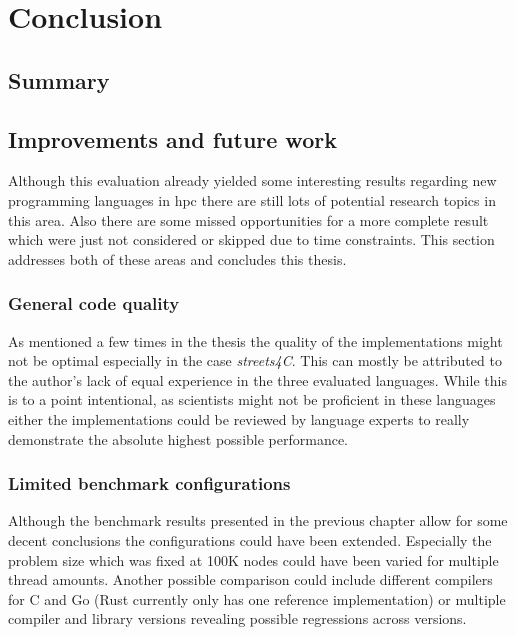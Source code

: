\chapter{Conclusion}
\label{ch:Conclusion}


\section{Summary}
\label{sec:Conclusion::Summary}

\section{Improvements and future work}
\label{sec:Conclusion::Improvements}

Although this evaluation already yielded some interesting results regarding new programming languages in \gls{hpc} there are still lots of potential research topics in this area. Also there are some missed opportunities for a more complete result which were just not considered or skipped due to time constraints. This section addresses both of these areas and concludes this thesis.

\subsection*{General code quality}
\label{subsec:Conclusion::Improvements::CodeQuality}

As mentioned a few times in the thesis the quality of the implementations might not be optimal especially in the case \textit{streets4C}. This can mostly be attributed to the author's lack of equal experience in the three evaluated languages. While this is to a point intentional, as scientists might not be proficient in these languages either the implementations could be reviewed by language experts to really demonstrate the absolute highest possible performance.

\subsection*{Limited benchmark configurations}
\label{subsec:Conclusion::Improvements::Configuration}

Although the benchmark results presented in the previous chapter allow for some decent conclusions the configurations could have been extended. Especially the problem size which was fixed at 100K nodes could have been varied for multiple thread amounts. Another possible comparison could include different compilers for C and Go (Rust currently only has one reference implementation) or multiple compiler and library versions revealing possible regressions across versions.

